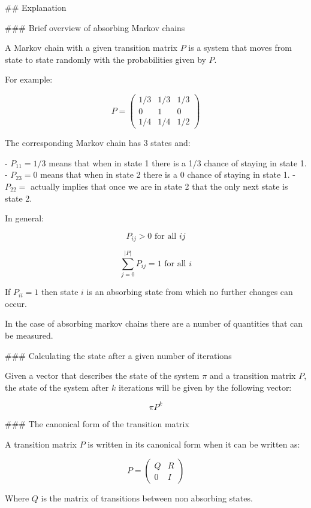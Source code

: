 \begin{md}
## Explanation

### Brief overview of absorbing Markov chains

A Markov chain with a given transition matrix $P$ is a system that moves from
state to state randomly with the probabilities given by $P$.

For example:

$$
P = \begin{pmatrix}
        1 / 3 & 1 / 3 & 1 / 3 \\
        0     & 1     & 0     \\
        1 / 4 & 1 / 4 & 1 / 2
    \end{pmatrix}
$$

The corresponding Markov chain has 3 states and:

- $P_{11}=1/3$ means that when in state 1 there is a 1/3 chance of staying in
  state 1.
- $P_{23}=0$ means that when in state 2 there is a 0 chance of staying in
  state 1.
- $P_{22}=$ actually implies that once we are in state 2 that the only next
  state is state 2.

In general:

$$
    P_{ij} > 0 \text{ for all }ij
$$

$$
    \sum_{j=0}^{|P|} P_{ij} = 1 \text{ for all }i
$$

If $P_{ii}=1$ then state $i$ is an absorbing state from which no further changes
can occur.

In the case of absorbing markov chains there are a number of quantities that can
be measured.

### Calculating the state after a given number of iterations

Given a vector that describes the state of the system $\pi$ and a transition
matrix $P$, the state of the system after $k$ iterations will be given by the
following vector:

$$
    \pi P ^ k
$$

### The canonical form of the transition matrix

A transition matrix $P$ is written in its canonical form when it can be written
as:

$$
  P =
  \left(\begin{array}{c|c}
    Q & R \\\hline
    0 & I
  \end{array}\right)
$$

Where $Q$ is the matrix of transitions between non absorbing states.


\end{md}
